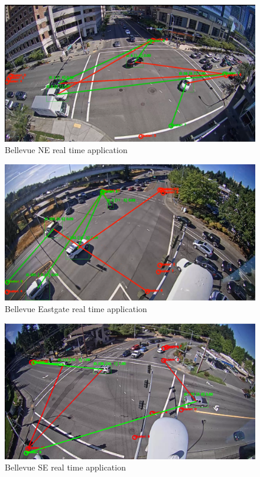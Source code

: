 \documentclass[acmtog, authorversion]{acmart}
\begin{document}
\begin{figure}[H]
    \includegraphics[width=1\columnwidth]{visualization/bellevue_ne.png}
    \caption{Bellevue NE real time application}
    \label{fig: BellevueNERealTime}
\end{figure}

\begin{figure}[H]
    \includegraphics[width=1\columnwidth]{visualization/bellevue_eastgate.png}
    \caption{Bellevue Eastgate real time application}
    \label{fig: BellevueEastgateRealTime}
\end{figure}

\begin{figure}[H]
    \includegraphics[width=1\columnwidth]{visualization/bellevue_se.png}
    \caption{Bellevue SE real time application}
    \label{fig: BellevueSERealTime}
\end{figure}
\end{document}
